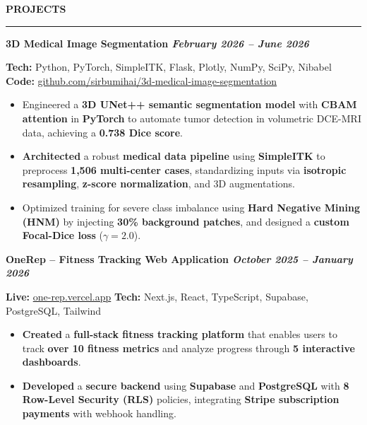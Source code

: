 \documentclass[10pt,letterpaper]{article}
\newenvironment{rSection}[1]{
  \vspace{4pt}
  {\bfseries\MakeUppercase{#1}}
  \vspace{2pt}
  \hrule
  \vspace{3pt}
}{
  \par\vspace{2pt}
}
\renewcommand{\section}[1]{\par\vspace{3pt}\noindent\textbf{#1}\par\vspace{1pt}}
\begin{document}
\begin{rSection}{Projects}
\section{3D Medical Image Segmentation \hfill \normalfont\textit{February 2026 – June 2026}}
\textbf{Tech:} Python, PyTorch, SimpleITK, Flask, Plotly, NumPy, SciPy, Nibabel \hfill
\textbf{Code:} \href{https://github.com/sirbumihai/3d-medical-image-segmentation}{github.com/sirbumihai/3d-medical-image-segmentation}
\begin{itemize}
    \item Engineered a \textbf{3D UNet++ semantic segmentation model} with \textbf{CBAM attention} in \textbf{PyTorch} to automate tumor detection in volumetric DCE-MRI data, achieving a \textbf{0.738 Dice score}.
    \item \textbf{Architected} a robust \textbf{medical data pipeline} using \textbf{SimpleITK} to preprocess \textbf{1,506 multi-center cases}, standardizing inputs via \textbf{isotropic resampling}, \textbf{z-score normalization}, and 3D augmentations.
    \item Optimized training for severe class imbalance using \textbf{Hard Negative Mining (HNM)} by injecting \textbf{30\% background patches}, and designed a \textbf{custom Focal-Dice loss} ($\gamma = 2.0$).
\end{itemize}

\section{OneRep – Fitness Tracking Web Application \hfill \normalfont\textit{October 2025 – January 2026}}
\textbf{Live:} \href{https://one-rep.vercel.app/}{one-rep.vercel.app} \hfill
\textbf{Tech:} Next.js, React, TypeScript, Supabase, PostgreSQL, Tailwind
\begin{itemize}
    \item \textbf{Created} a \textbf{full-stack fitness tracking platform} that enables users to track \textbf{over 10 fitness metrics} and analyze progress through \textbf{5 interactive dashboards}.
    \item \textbf{Developed} a \textbf{secure backend} using \textbf{Supabase} and \textbf{PostgreSQL} with \textbf{8 Row-Level Security (RLS)} policies, integrating \textbf{Stripe subscription payments} with webhook handling.
\end{itemize}

\end{rSection}
\end{document}
